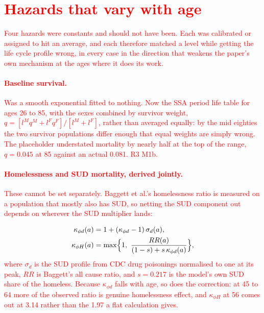 \documentclass[11pt]{article}
\newcommand{\nw}[1]{\textcolor{red}{#1}}
\begin{document}
\section{\nw{Hazards that vary with age}}
\label{sec:hazards}

\nw{Four hazards were constants and should not have been. Each was calibrated or
assigned to hit an average, and each therefore matched a level while getting the
life cycle profile wrong, in every case in the direction that weakens the
paper's own mechanism at the ages where it does its work.}

\nw{\paragraph{Baseline survival.} Was a smooth exponential fitted to nothing.
Now the SSA period life table for ages 26 to 85, with the sexes combined by
survivor weight, $q=[l^Mq^M+l^Fq^F]/[l^M+l^F]$, rather than averaged equally:
by the mid eighties the two survivor populations differ enough that equal
weights are simply wrong. The placeholder understated mortality by nearly half
at the top of the range, $q=0.045$ at 85 against an actual 0.081. R3 M1b.}

\nw{\paragraph{Homelessness and SUD mortality, derived jointly.} These cannot be
set separately. Baggett et al.'s homelessness ratio is measured on a population
that mostly also has SUD, so netting the SUD component out depends on wherever
the SUD multiplier lands:}
\begin{align}
\kappa_{\phi d}(a) &= 1+(\kappa_{\phi d}-1)\,\sigma_d(a),\\
\kappa_{\phi H}(a) &= \max\Bigl\{1,\ \frac{RR(a)}{(1-s)+s\,\kappa_{\phi d}(a)}\Bigr\},
\end{align}
\nw{where $\sigma_d$ is the SUD profile from CDC drug poisonings normalised to
one at its peak, $RR$ is Baggett's all cause ratio, and $s=0.217$ is the model's
own SUD share of the homeless. Because $\kappa_{\phi d}$ falls with age, so does
the correction: at 45 to 64 more of the observed ratio is genuine homelessness
effect, and $\kappa_{\phi H}$ at 56 comes out at 3.14 rather than the 1.97 a
flat calculation gives.}
\end{document}
